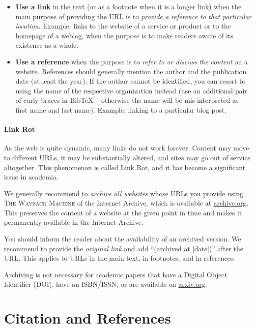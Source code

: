 \begin{itemize}
  \item \textbf{Use a link} in the text (or as a footnote when it is a longer link) when the main purpose of providing the URL is to \emph{provide a reference to that particular location}. Example: links to the website of a service or product or to the homepage of a weblog, when the purpose is to make readers aware of its existence as a whole.
  \item \textbf{Use a reference} when the purpose is to \emph{refer to or discuss the content} on a website. References should generally mention the author and the publication date (at least the year). If the author cannot be identified, you can resort to using the name of the respective organization instead (use an additional pair of curly braces in BibTeX -- otherwise the name will be mis-interpreted as first name and last name). Example: linking to a particular blog post.
\end{itemize}

\paragraph{Link Rot}

As the web is quite dynamic, many links do not work forever. Content may move to different URLs, it may be substantially altered, and sites may go out of service altogether. This phenomenon is called Link Rot, and it has become a significant issue in academia.

We generally recommend to \emph{archive all websites} whose URLs you provide using \textsc{The Wayback Machine} of the Internet Archive, which is available at \url{archive.org}.
This preserves the content of a website at the given point in time and makes it permanently available in the Internet Archive.

You should inform the reader about the availability of an archived version. We recommend to provide the \emph{original link} and add ``(archived at [date])'' after the URL. This applies to URLs in the main text, in footnotes, and in references.

Archiving is not necessary for academic papers that have a Digital Object Identifier (DOI), have an ISBN/ISSN, or are available on \url{arxiv.org}.


\section{Citation and References}

